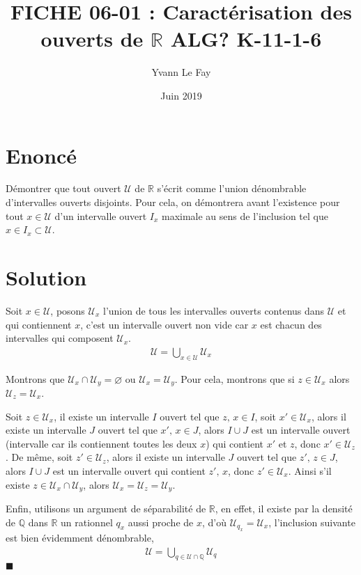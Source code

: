 \documentclass{article}
\newcommand*{\QED}{\hfill\ensuremath{\blacksquare}}%
\begin{document}
\title{FICHE 06-01 : Caractérisation des ouverts de $\mathbb{R}$ ALG? K-11-1-6}
\author{Yvann Le Fay}
\date{Juin 2019}
\maketitle

\section*{Enoncé}
Démontrer que tout ouvert $\mathcal{U}$ de $\mathbb{R}$ s'écrit comme l'union dénombrable d'intervalles ouverts disjoints. Pour cela, on démontrera avant l'existence pour tout $x\in \mathcal{U}$ d'un intervalle ouvert $I_x$ maximale au sens de l'inclusion tel que $x\in I_x\subset \mathcal{U}$.
\section*{Solution}
Soit $x\in \mathcal{U}$, posons $\mathcal{U}_x$ l'union de tous les intervalles ouverts contenus dans $\mathcal{U}$ et qui contiennent $x$, c'est un intervalle ouvert non vide car $x$ est chacun des intervalles qui composent $\mathcal{U}_x$.
\begin{align*}
\mathcal{U} = \bigcup_{x\in \mathcal{U}}\mathcal{U}_x
\end{align*}

Montrons que $\mathcal{U}_x\cap \mathcal{U}_y = \varnothing$ ou $\mathcal{U}_x = \mathcal{U}_y$. Pour cela, montrons que si $z\in\mathcal{U}_x$ alors $\mathcal{U}_z = \mathcal{U}_x$.

Soit $z\in\mathcal{U}_x$, il existe un intervalle $I$ ouvert tel que $z,\, x\in I$, soit $x'\in \mathcal{U}_x$, alors il existe un intervalle $J$ ouvert tel que $x',\, x\in J$, alors $I\cup J$ est un intervalle ouvert (intervalle car ils contiennent toutes les deux $x$) qui contient $x'$ et $z$, donc $x'\in \mathcal{U}_z$. De même, soit $z'\in \mathcal{U}_z$, alors il existe un intervalle $J$ ouvert tel que $z',\,z\in J$, alors $I\cup J$ est un intervalle ouvert qui contient $z',\, x$, donc $z'\in\mathcal{U}_x$. Ainsi s'il existe $z\in\mathcal{U}_x\cap \mathcal{U}_y$, alors $\mathcal{U}_x=\mathcal{U}_z=\mathcal{U}_y$. 

Enfin, utilisons un argument de séparabilité de $\mathbb{R}$, en effet, il existe par la densité de $\mathbb{Q}$ dans $\mathbb{R}$ un rationnel $q_x$ aussi proche de $x$, d'où $\mathcal{U}_{q_x}=\mathcal{U}_x$, l'inclusion suivante est bien évidemment dénombrable, 
\begin{align*}
\mathcal{U} = \bigcup_{q\in\mathcal{U}\cap \mathbb{Q}}\mathcal{U}_q
\end{align*}
\QED
\end{document}
